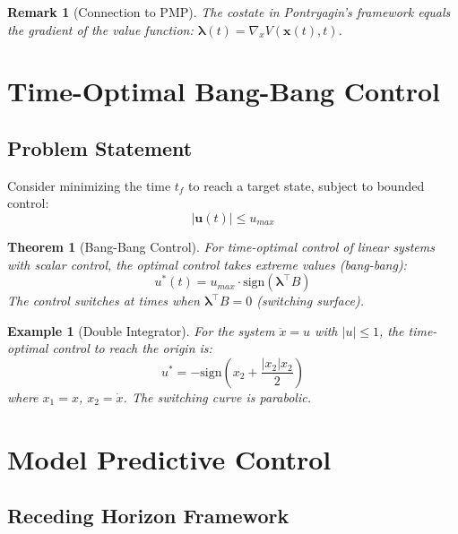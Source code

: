 \documentclass[a4paper, 11pt]{article}
\newtheorem{theorem}{Theorem}[section]
\newtheorem{example}{Example}[section]
\newtheorem{remark}{Remark}[section]
\begin{document}
\begin{remark}[Connection to PMP]
The costate in Pontryagin's framework equals the gradient of the value function:
$\boldsymbol{\lambda}(t) = \nabla_x V(\mathbf{x}(t), t)$.
\end{remark}

\section{Time-Optimal Bang-Bang Control}

\subsection{Problem Statement}

Consider minimizing the time $t_f$ to reach a target state, subject to bounded control:
\begin{equation}
|\mathbf{u}(t)| \leq u_{max}
\end{equation}

\begin{theorem}[Bang-Bang Control]
For time-optimal control of linear systems with scalar control, the optimal control takes
extreme values (bang-bang):
\begin{equation}
u^*(t) = u_{max} \cdot \text{sign}(\boldsymbol{\lambda}^\top B)
\end{equation}
The control switches at times when $\boldsymbol{\lambda}^\top B = 0$ (switching surface).
\end{theorem}

\begin{example}[Double Integrator]
For the system $\ddot{x} = u$ with $|u| \leq 1$, the time-optimal control to reach
the origin is:
\begin{equation}
u^* = -\text{sign}\left(x_2 + \frac{|x_2|x_2}{2}\right)
\end{equation}
where $x_1 = x$, $x_2 = \dot{x}$. The switching curve is parabolic.
\end{example}

\section{Model Predictive Control}

\subsection{Receding Horizon Framework}
\end{document}
